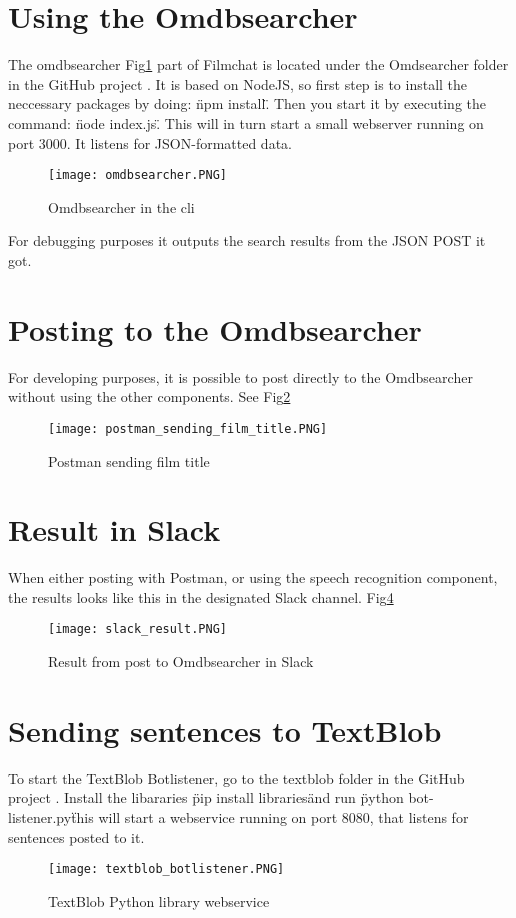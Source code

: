 \documentclass[11pt,fleqn]{book} %
\begin{document}
\newpage
\section{Using the Omdbsearcher}
The omdbsearcher Fig\ref{fig:omdbsearcher} part of Filmchat is located under the Omdsearcher folder in the GitHub project \cite{Github2017GitHubProject}. It is based on NodeJS, so first step is to install the neccessary packages by doing: \"npm install\". Then you start it by executing the command: \"node index.js\". This will in turn start a small webserver running on port 3000.
It listens for JSON-formatted data.
\begin{figure}[]
  \centering
   \texttt{[image: omdbsearcher.PNG]}
  \caption{Omdbsearcher in the cli}
  \label{fig:omdbsearcher}
\end{figure}
For debugging purposes it outputs the search results from the JSON POST it got.

\newpage
\section{Posting to the Omdbsearcher}
For developing purposes, it is possible to post directly to the Omdbsearcher without using the other components. See Fig\ref{fig:postman-film}

\begin{figure}[]
  \centering
   \texttt{[image: postman\_sending\_film\_title.PNG]}
  \caption{Postman sending film title}
  \label{fig:postman-film}
\end{figure}

\newpage
\section{Result in Slack}
When either posting with Postman, or using the speech recognition component, the results looks like this in the designated Slack channel. Fig\ref{fig:slack-result}

\begin{figure}[]
  \centering
   \texttt{[image: slack\_result.PNG]}
  \caption{Result from post to Omdbsearcher in Slack}
  \label{fig:slack-result}
\end{figure}

\newpage
\section{Sending sentences to TextBlob}
To start the TextBlob Botlistener, go to the textblob folder in the GitHub project \cite{Github2017GitHubProject}. Install the libararies \"pip install libraries\" and run \"python bot-listener.py\" this will start a webservice running on port 8080, that listens for sentences posted to it.
\begin{figure}[]
  \centering
   \texttt{[image: textblob\_botlistener.PNG]}
  \caption{TextBlob Python library webservice}
  \label{fig:slack-result}
\end{figure}
\end{document}
